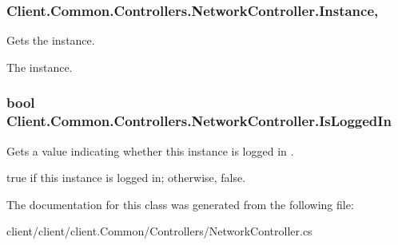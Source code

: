 \subsubsection[{Instance}]{ Client.\+Common.\+Controllers.\+Network\+Controller.\+Instance\hspace{0.3cm}{\ttfamily [static]}, {\ttfamily [get]}}\label{classClient_1_1Common_1_1Controllers_1_1NetworkController_a24ad367082839e77f347f4a532d023ff}


Gets the instance. 

The instance.\hypertarget{classClient_1_1Common_1_1Controllers_1_1NetworkController_afd2b5bdfc0da3720c3bbb257c0f73d94}{}
\subsubsection[{Is\+Logged\+In}]{\setlength{\rightskip}{0pt plus 5cm}bool Client.\+Common.\+Controllers.\+Network\+Controller.\+Is\+Logged\+In\hspace{0.3cm}{\ttfamily [get]}}\label{classClient_1_1Common_1_1Controllers_1_1NetworkController_afd2b5bdfc0da3720c3bbb257c0f73d94}


Gets a value indicating whether this instance is logged in . 

{\ttfamily true} if this instance is logged in; otherwise, {\ttfamily false}.

The documentation for this class was generated from the following file\+:\begin{DoxyCompactItemize}
\item 
client/client/client.\+Common/\+Controllers/Network\+Controller.\+cs\end{DoxyCompactItemize}
